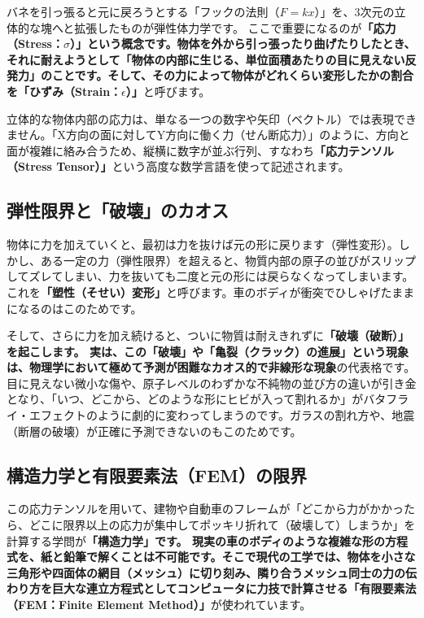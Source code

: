 バネを引っ張ると元に戻ろうとする「フックの法則（\(F=kx\)）」を、3次元の立体的な塊へと拡張したものが弾性体力学です。 ここで重要になるのが\textbf{「応力（Stress：\ensuremath{\sigma}）」という概念です。物体を外から引っ張ったり曲げたりしたとき、それに耐えようとして「物体の内部に生じる、単位面積あたりの目に見えない反発力」のことです。そして、その力によって物体がどれくらい変形したかの割合を「ひずみ（Strain：\ensuremath{\epsilon}）」}と呼びます。

立体的な物体内部の応力は、単なる一つの数字や矢印（ベクトル）では表現できません。「X方向の面に対してY方向に働く力（せん断応力）」のように、方向と面が複雑に絡み合うため、縦横に数字が並ぶ行列、すなわち\textbf{「応力テンソル（Stress Tensor）」}という高度な数学言語を使って記述されます。

\subsection{弾性限界と「破壊」のカオス}

物体に力を加えていくと、最初は力を抜けば元の形に戻ります（弾性変形）。しかし、ある一定の力（弾性限界）を超えると、物質内部の原子の並びがスリップしてズレてしまい、力を抜いても二度と元の形には戻らなくなってしまいます。これを\textbf{「塑性（そせい）変形」}と呼びます。車のボディが衝突でひしゃげたままになるのはこのためです。

そして、さらに力を加え続けると、ついに物質は耐えきれずに\textbf{「破壊（破断）」を起こします。 実は、この「破壊」や「亀裂（クラック）の進展」という現象は、物理学において極めて予測が困難なカオス的で非線形な現象}の代表格です。 目に見えない微小な傷や、原子レベルのわずかな不純物の並び方の違いが引き金となり、「いつ、どこから、どのような形にヒビが入って割れるか」がバタフライ・エフェクトのように劇的に変わってしまうのです。ガラスの割れ方や、地震（断層の破壊）が正確に予測できないのもこのためです。

\subsection{構造力学と有限要素法（FEM）の限界}

この応力テンソルを用いて、建物や自動車のフレームが「どこから力がかかったら、どこに限界以上の応力が集中してポッキリ折れて（破壊して）しまうか」を計算する学問が\textbf{「構造力学」です。 現実の車のボディのような複雑な形の方程式を、紙と鉛筆で解くことは不可能です。そこで現代の工学では、物体を小さな三角形や四面体の網目（メッシュ）に切り刻み、隣り合うメッシュ同士の力の伝わり方を巨大な連立方程式としてコンピュータに力技で計算させる「有限要素法（FEM：Finite Element Method）」}が使われています。

